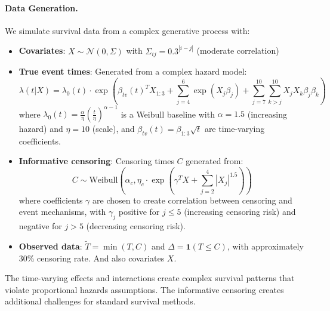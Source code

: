 \documentclass{article}
\theoremstyle{remark}
\begin{document}
\paragraph{Data Generation.}
We simulate survival data from a complex generative process with:
\begin{itemize}[leftmargin=15pt]
\item \textbf{Covariates}: $X \sim \mathcal{N}(0, \Sigma)$ with $\Sigma_{ij} = 0.3^{|i-j|}$ (moderate correlation)
\item \textbf{True event times}: Generated from a complex hazard model:
\[
\lambda(t|X) = \lambda_0(t) \cdot \exp\left(\beta_{tv}(t)^TX_{1:3} + \sum_{j=4}^6\exp(X_j\beta_j) + \sum_{j=7}^{10}\sum_{k>j}^{10}X_jX_k\beta_j\beta_k\right)
\]
where $\lambda_0(t) = \frac{\alpha}{\eta}\left(\frac{t}{\eta}\right)^{\alpha-1}$ is a Weibull baseline with $\alpha=1.5$ (increasing hazard) and $\eta=10$ (scale), and $\beta_{tv}(t) = \beta_{1:3}\sqrt{t}$ are time-varying coefficients.
\item \textbf{Informative censoring}: Censoring times $C$ generated from:
\[
C \sim \text{Weibull}\left(\alpha_c, \eta_c \cdot \exp\left(\gamma^T X + \sum_{j=2}^4|X_j|^{1.5}\right)\right)
\]
where coefficients $\gamma$ are chosen to create correlation between censoring and event mechanisms, with $\gamma_j$ positive for $j \leq 5$ (increasing censoring risk) and negative for $j > 5$ (decreasing censoring risk).
\item \textbf{Observed data}: $\tilde{T} = \min(T, C)$ and $\Delta = \mathbf{1}{(T \leq C)}$, with approximately 30\% censoring rate. And also covariates $X$.
\end{itemize}
The time-varying effects and interactions create complex survival patterns that violate proportional hazards assumptions. The informative censoring creates additional challenges for standard survival methods.
\end{document}
